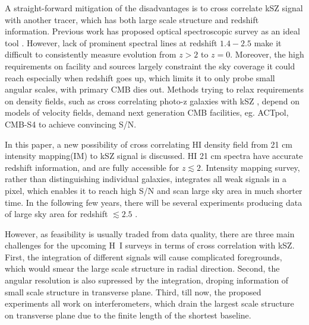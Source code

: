 A straight-forward mitigation of the disadvantages is to cross correlate 
kSZ signal with another tracer, which has both large scale structure and redshift information. 
Previous work has proposed optical spectroscopic survey as an ideal tool \cite{Hand12,Shao11,Li14}. 
However, lack of prominent spectral lines at redshift $1.4-2.5$ 
make it difficult to consistently measure evolution from $z>2$ to $z=0$. 
Moreover, the high requirements on facility and sources 
largely constraint the sky coverage it could reach 
especially when redshift goes up, 
which limits it to only probe small angular scales, 
with primary CMB dies out. 
%
Methods trying to relax requirements on density fields, such as 
cross correlating photo-z galaxies with kSZ \cite{Hill16,Ferraro16}, 
depend on models of velocity fields,  
demand next generation CMB facilities, eg. 
ACTpol, CMB-S4 
to achieve 
convincing S/N.


In this paper, a new possibility of cross correlating HI density field from 21 cm intensity mapping(IM) to kSZ signal is discussed. 
HI 21 cm spectra have accurate redshift information, 
and are fully accessible for $z\lesssim2$.  
Intensity mapping survey, 
rather than distinguishing individual galaxies, 
integrates all weak signals in a pixel,  
which enables it to reach high S/N and scan large sky area 
in much shorter time. 
In the following few years, there will be several experiments 
producing data of large sky area for redshift $\lesssim2.5$ 
\cite{2014CHIME, TIANLAI, HIRAX}.

However, as feasibility is usually traded from data quality, 
there are three main challenges for the upcoming H~I surveys  
in terms of cross correlation with kSZ. 
First, the integration of different signals will cause complicated foregrounds, 
which would smear the large scale structure in radial direction\cite{DiMatteo04,Masui13}. 
Second, the angular resolution is also supressed by the integration, 
droping information of small scale structure in transverse plane. 
Third, till now, the proposed experiments all work on interferometers, 
which drain the largest scale structure on transverse plane  
due to the finite length of the shortest baseline. 

